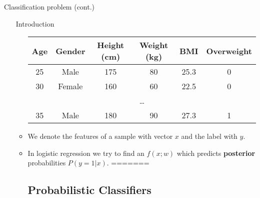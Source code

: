 \documentclass[serif, aspectratio=169]{beamer}
\begin{document}
\begin{frame}{Classification problem (cont.)}
\begin{itemize}
\begin{frame}{Introduction}
\begin{itemize}
        
        \begin{table}[h!]
        \centering
        \begin{tabular}{|c|c|c|c|c|c|}
        \hline
        \textcolor{deepred}{Age} & \textcolor{deepred}{Gender} & \textcolor{deepred}{Height (cm)} & \textcolor{deepred}{Weight (kg)} & \textcolor{deepred}{BMI} & \textcolor{deepgreen}{Overweight} \\ \hline
        25 & Male & 175 & 80 & 25.3 & 0 \\ \hline
        30 & Female & 160 & 60 & 22.5 & 0 \\ \hline
        \multicolumn{6}{|c|}{\dots} \\ \hline
        35 & Male & 180 & 90 & 27.3 & 1 \\ \hline
        \end{tabular}
        \end{table}
        \item We denote the \textcolor{deepred}{features} of a sample with vector $x$ and the \textcolor{deepgreen}{label} with $y$.
        \item In logistic regression we try to find an $f(x;w)$ which predicts \textbf{posterior} probabilities $P(y=1|x)$.
=======
\subsection{Probabilistic Classifiers}


\end{itemize}
\end{frame}
\end{itemize}
\end{frame}
\end{document}
